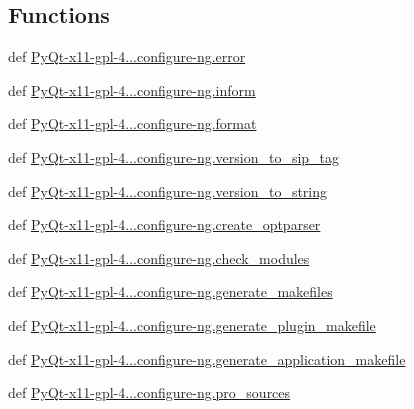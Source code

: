 \subsection*{Functions}
\begin{DoxyCompactItemize}
\item 
def \hyperlink{namespacePyQt-x11-gpl-4_811_82_1_1configure-ng_a825f441f79b982a7afa24bc919a8746f}{Py\+Qt-\/x11-\/gpl-\/4...\+configure-\/ng.\+error}
\item 
def \hyperlink{namespacePyQt-x11-gpl-4_811_82_1_1configure-ng_afba18e7664257afca206de2812cd3c35}{Py\+Qt-\/x11-\/gpl-\/4...\+configure-\/ng.\+inform}
\item 
def \hyperlink{namespacePyQt-x11-gpl-4_811_82_1_1configure-ng_ad7c14d59520ae295e8f00d1e7c1a93f9}{Py\+Qt-\/x11-\/gpl-\/4...\+configure-\/ng.\+format}
\item 
def \hyperlink{namespacePyQt-x11-gpl-4_811_82_1_1configure-ng_a76806d4a4438a757595fddcf767087b5}{Py\+Qt-\/x11-\/gpl-\/4...\+configure-\/ng.\+version\+\_\+to\+\_\+sip\+\_\+tag}
\item 
def \hyperlink{namespacePyQt-x11-gpl-4_811_82_1_1configure-ng_a657a83b4b6b7d204026d8886e25b7239}{Py\+Qt-\/x11-\/gpl-\/4...\+configure-\/ng.\+version\+\_\+to\+\_\+string}
\item 
def \hyperlink{namespacePyQt-x11-gpl-4_811_82_1_1configure-ng_addd321fb67ee0b54293991debea2d501}{Py\+Qt-\/x11-\/gpl-\/4...\+configure-\/ng.\+create\+\_\+optparser}
\item 
def \hyperlink{namespacePyQt-x11-gpl-4_811_82_1_1configure-ng_ac1defbbcbca22982a3ea8d8b2a21de13}{Py\+Qt-\/x11-\/gpl-\/4...\+configure-\/ng.\+check\+\_\+modules}
\item 
def \hyperlink{namespacePyQt-x11-gpl-4_811_82_1_1configure-ng_a74273eeb167d7be2a13363e9374f5b4b}{Py\+Qt-\/x11-\/gpl-\/4...\+configure-\/ng.\+generate\+\_\+makefiles}
\item 
def \hyperlink{namespacePyQt-x11-gpl-4_811_82_1_1configure-ng_ad9303b54272cf0f9eed2c14c5e4e60b6}{Py\+Qt-\/x11-\/gpl-\/4...\+configure-\/ng.\+generate\+\_\+plugin\+\_\+makefile}
\item 
def \hyperlink{namespacePyQt-x11-gpl-4_811_82_1_1configure-ng_a476728d65d3361170cbed02efeffb1ce}{Py\+Qt-\/x11-\/gpl-\/4...\+configure-\/ng.\+generate\+\_\+application\+\_\+makefile}
\item 
def \hyperlink{namespacePyQt-x11-gpl-4_811_82_1_1configure-ng_ae7c41ad989a082b794810e68712d36c0}{Py\+Qt-\/x11-\/gpl-\/4...\+configure-\/ng.\+pro\+\_\+sources}

\end{DoxyCompactItemize}
